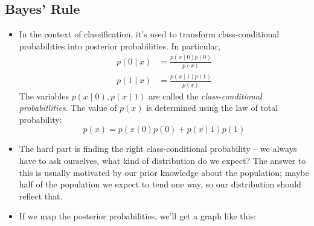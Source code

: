 \subsection{Bayes' Rule}
\begin{itemize}
	\item In the context of classification, it's used to transform class-conditional
		probabilities into posterior probabilities. In particular,
		\begin{align*}
			p(0 \mid x) &= \frac{p(x \mid 0) p(0)}{p(x)}\\
			p(1 \mid x) &=  \frac{p(x \mid 1) p(1)}{p(x)} 
		\end{align*}
		The variables \( p(x \mid 0), p(x \mid 1) \) are called the
		\textit{class-conditional probabitlities}. The value of \( p(x) \) is
		determined using the law of total probability:
		\[
			p(x) = p(x \mid 0) p(0) + p(x \mid 1) p(1)
		\]
	\item The hard part is finding the right class-conditional probability --
		we always have to ask ourselves, what kind of distribution do we expect? The
		answer to this is usually motivated by our prior knowledge about the
		population; maybe half of the population we expect to tend one way, so our
		distribution should reflect that. 
	\item If we map the posterior probabilities, we'll get a graph like this: 


\end{itemize}
